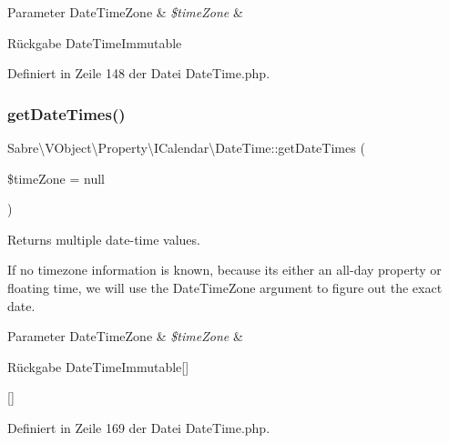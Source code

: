 \begin{DoxyParams}[1]{Parameter}
Date\+Time\+Zone & {\em \$time\+Zone} & \\
\hline
\end{DoxyParams}
\begin{DoxyReturn}{Rückgabe}
Date\+Time\+Immutable 
\end{DoxyReturn}


Definiert in Zeile 148 der Datei Date\+Time.\+php.

\mbox{\label{class_sabre_1_1_v_object_1_1_property_1_1_i_calendar_1_1_date_time_ac8ee4f3b001ea8c5e66673c318753c81}} 
\subsubsection{\texorpdfstring{get\+Date\+Times()}{getDateTimes()}}
{\footnotesize\ttfamily Sabre\textbackslash{}\+V\+Object\textbackslash{}\+Property\textbackslash{}\+I\+Calendar\textbackslash{}\+Date\+Time\+::get\+Date\+Times (\begin{DoxyParamCaption}\item[{Date\+Time\+Zone}]{\$time\+Zone = {\ttfamily null} }\end{DoxyParamCaption})}

Returns multiple date-\/time values.

If no timezone information is known, because it\textquotesingle{}s either an all-\/day property or floating time, we will use the Date\+Time\+Zone argument to figure out the exact date.


\begin{DoxyParams}[1]{Parameter}
Date\+Time\+Zone & {\em \$time\+Zone} & \\
\hline
\end{DoxyParams}
\begin{DoxyReturn}{Rückgabe}
Date\+Time\+Immutable\mbox{[}\mbox{]} 

\mbox{[}\mbox{]} 
\end{DoxyReturn}


Definiert in Zeile 169 der Datei Date\+Time.\+php.

